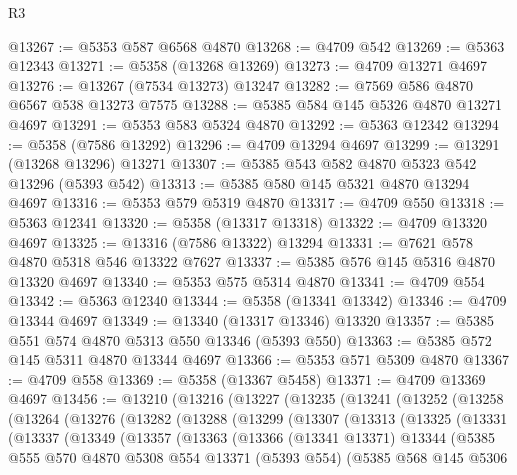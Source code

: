 \begin{lexlean}{R3}
\begin{coremodule}
@13267 := @5353 @587 @6568 @4870
@13268 := @4709 @542
@13269 := @5363 @12343
@13271 := @5358 (@13268 @13269)
@13273 := @4709 @13271 @4697
@13276 := @13267 (@7534 @13273) @13247
@13282 := @7569 @586 @4870 @6567 @538 @13273 @7575
@13288 := @5385 @584 @145 @5326 @4870 @13271 @4697
@13291 := @5353 @583 @5324 @4870
@13292 := @5363 @12342
@13294 := @5358 (@7586 @13292)
@13296 := @4709 @13294 @4697
@13299 := @13291 (@13268 @13296) @13271
@13307 := @5385 @543 @582 @4870 @5323 @542 @13296 (@5393 @542)
@13313 := @5385 @580 @145 @5321 @4870 @13294 @4697
@13316 := @5353 @579 @5319 @4870
@13317 := @4709 @550
@13318 := @5363 @12341
@13320 := @5358 (@13317 @13318)
@13322 := @4709 @13320 @4697
@13325 := @13316 (@7586 @13322) @13294
@13331 := @7621 @578 @4870 @5318 @546 @13322 @7627
@13337 := @5385 @576 @145 @5316 @4870 @13320 @4697
@13340 := @5353 @575 @5314 @4870
@13341 := @4709 @554
@13342 := @5363 @12340
@13344 := @5358 (@13341 @13342)
@13346 := @4709 @13344 @4697
@13349 := @13340 (@13317 @13346) @13320
@13357 := @5385 @551 @574 @4870 @5313 @550 @13346 (@5393 @550)
@13363 := @5385 @572 @145 @5311 @4870 @13344 @4697
@13366 := @5353 @571 @5309 @4870
@13367 := @4709 @558
@13369 := @5358 (@13367 @5458)
@13371 := @4709 @13369 @4697
@13456 := @13210
    (@13216
      (@13227
        (@13235
          (@13241
            (@13252
              (@13258
                (@13264
                  (@13276
                    (@13282
                      (@13288
                        (@13299
                          (@13307
                            (@13313
                              (@13325
                                (@13331
                                  (@13337
                                    (@13349
                                      (@13357
                                        (@13363
                                          (@13366
                                            (@13341 @13371)
                                            @13344
                                            (@5385
                                              @555
                                              @570
                                              @4870
                                              @5308
                                              @554
                                              @13371
                                              (@5393 @554)
                                              (@5385
                                                @568
                                                @145
                                                @5306

\end{coremodule}
\end{lexlean}
